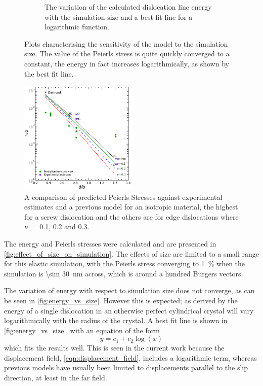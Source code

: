 \begin{figure}
\begin{subfigure}{0.4\textwidth}
\caption{The variation of the calculated dislocation line energy with the simulation size and a best fit line for a logarithmic function.\label{fig:energy_vs_size}}
\end{subfigure}
\caption[The effect of simulation size on dislocation energy and Peierls stress.]{Plots characterising the sensitivity of the model to the simulation size. The value of the Peierls stress is quite quickly converged to a constant, the energy in fact increases logarithmically, as shown by the best fit line.\label{fig:effect_of_size_on_simulation}}
\end{figure}

\begin{figure}
\centering
\includegraphics[width=0.5\textwidth]{tp_G_vs_d_b}
\caption[A comparison of predicted Peierls Stresses against previous estimates.]{A comparison of predicted Peierls Stresses against experimental estimates \cite{Wang1996} and a previous model \cite{Clegg2006} for an isotropic material, the highest for a screw dislocation and the others are for edge dislocations where $\nu=$ 0.1, 0.2 and 0.3. \label{fig:tp_vs_d_b}}
\end{figure}


The energy and Peierls stresses were calculated and are presented in \autoref{fig:effect_of_size_on_simulation}. The effects of size are limited to a small range for this elastic simulation, with the Peierls stress converging to \SI{1}{\percent} when the simulation is  \SI{\sim 30}{\nano\meter} across, which is around a hundred Burgers vectors.

The variation of energy with respect to simulation size does not converge, as can be seen in \autoref{fig:energy_vs_size}. However this is expected; as derived by \citet{Nabarro1947} the energy of a single dislocation in an otherwise perfect cylindrical crystal will vary logarithmically with the radius of the crystal. A best fit line is shown in \autoref{fig:energy_vs_size}, with an equation of the form
\begin{equation}
y = c_1 + c_2 \log \left( x \right)
\end{equation}
which fits the results well. This is seen in the current work because the displacement field, \ref{eqn:displacement_field},  includes a logarithmic term, whereas previous models have usually been limited to displacements parallel to the slip direction, at least in the far field.



